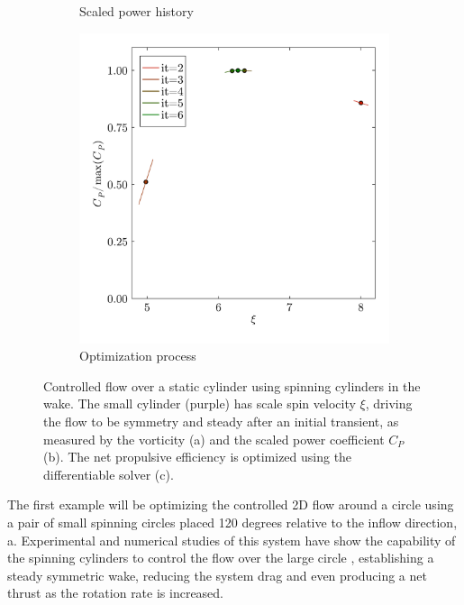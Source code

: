 \documentclass[10pt,a4paper]{article}
\begin{document}
\begin{figure}
\begin{subfigure}[b]{0.38\linewidth}
        \vspace{-1cm}
        \caption{Scaled power history}
    \end{subfigure}\hspace{20pt}
    \begin{subfigure}[b]{0.38\linewidth}
        \centering
        \includegraphics[width=\linewidth]{img/SpinOptim.pdf}
        \vspace{-1cm}
        \caption{Optimization process}
    \end{subfigure}
    \caption{Controlled flow over a static cylinder using spinning cylinders in the wake. The small cylinder (purple) has scale spin velocity $\xi$, driving the flow to be symmetry and steady after an initial transient, as measured by the vorticity (a) and the scaled power coefficient $C_P$ (b). The net propulsive efficiency is optimized using the differentiable solver (c).}
    \label{fig:spinning_circle}
\end{figure}

The first example will be optimizing the controlled 2D flow around a circle using a pair of small spinning circles placed 120 degrees relative to the inflow direction, a. Experimental and numerical studies of this system have show the capability of the spinning cylinders to control the flow over the large circle \cite{schulmeister2017}, establishing a steady symmetric wake, reducing the system drag and even producing a net thrust as the rotation rate is increased.
\end{document}
